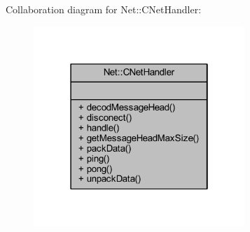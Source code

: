 Collaboration diagram for Net\+:\+:C\+Net\+Handler\+:
\nopagebreak
\begin{figure}[H]
\begin{center}
\leavevmode
\includegraphics[width=226pt]{class_net_1_1_c_net_handler__coll__graph}
\end{center}
\end{figure}
